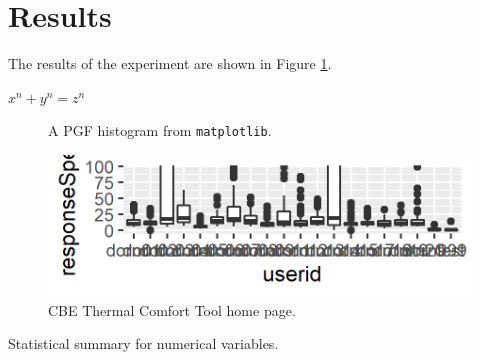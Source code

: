 

\section{Results}

The results of the experiment are shown in Figure \ref{fig:figure_count_responses}.

$ x^n + y^n = z^n $

\begin{figure}
    \begin{center}
        
    \end{center}
    \caption{A PGF histogram from \texttt{matplotlib}.}\label{fig:figure_count_responses}
\end{figure}

\begin{figure}[htbp]
    \centering
    \includegraphics[width=\textwidth]{figures/plot_r.png}
    \caption{CBE Thermal Comfort Tool home page.}
    \label{fig:cbe_ashrae}
\end{figure}

\begin{center}

	\begin{table}[!t]
	\caption{Statistical summary for numerical variables.
	{\label{tab:stats_num_data}}}
	
	\end{table}
\end{center}